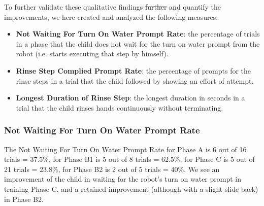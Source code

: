 \documentclass{ut-thesis}
\providecommand{\DIFdeltex}[1]{{\protect\color{red}\sout{#1}}}                      %
\providecommand{\DIFdelbegin}{} %
\providecommand{\DIFdelend}{} %
\providecommand{\DIFdel}[1]{\texorpdfstring{\DIFdeltex{#1}}{}} %
\begin{document}
%
To further validate these qualitative findings \DIFdelbegin \DIFdel{further }\DIFdelend and quantify the improvements, we here created and analyzed the following measures:
\begin{itemize}
	\item \textbf{Not Waiting For Turn On Water Prompt Rate}: the percentage of trials in a phase that the child does not wait for the turn on water prompt from the robot (i.e. starts executing that step by himself).
	\item \textbf{Rinse Step Complied Prompt Rate}: the percentage of prompts for the rinse steps in a trial that the child followed by showing an effort of attempt.
	\item \textbf{Longest Duration of Rinse Step}: the longest duration in seconds in a trial that the child rinses hands continuously without terminating.
\end{itemize}
\subsubsection{Not Waiting For Turn On Water Prompt Rate}
The Not Waiting For Turn On Water Prompt Rate for Phase A is 6 out of 16 trials = 37.5\%, for Phase B1 is 5 out of 8 trials = 62.5\%, for Phase C is 5 out of 21 trials = 23.8\%, for Phase B2 is 2 out of 5 trials = 40\%.  We see an improvement of the child in waiting for the robot's turn on water prompt in training Phase C, and a retained improvement (although with a slight slide back) in Phase B2.
\end{document}
